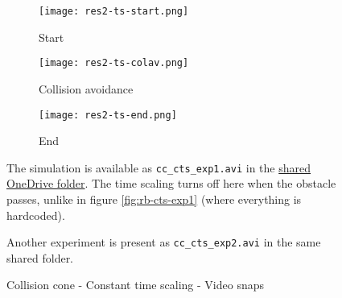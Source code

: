 \begin{figure}
    \centering
    \begin{subfigure}[b]{0.3\textwidth}
        \texttt{[image: res2-ts-start.png]}
        \caption{Start}
    \end{subfigure}
    \begin{subfigure}[b]{0.3\textwidth}
        \texttt{[image: res2-ts-colav.png]}
        \caption{Collision avoidance}
    \end{subfigure}
    \begin{subfigure}[b]{0.3\textwidth}
        \texttt{[image: res2-ts-end.png]}
        \caption{End}
    \end{subfigure}
    \caption{Collision cone - Constant time scaling - Video snaps}
    \label{fig:cc-cts-exp1}
    \small
        The simulation is available as \texttt{cc\_cts\_exp1.avi} in the \href{https://iiitaphyd-my.sharepoint.com/:f:/g/personal/avneesh_mishra_research_iiit_ac_in/Er_wRqK4hxVLjVdL56rfDxYBKr9PPed1laN48hLgLisf4w}{shared OneDrive folder}. The time scaling turns off here when the obstacle passes, unlike in figure \ref{fig:rb-cts-exp1} (where everything is hardcoded).

        Another experiment is present as \texttt{cc\_cts\_exp2.avi} in the same shared folder.
\end{figure}

